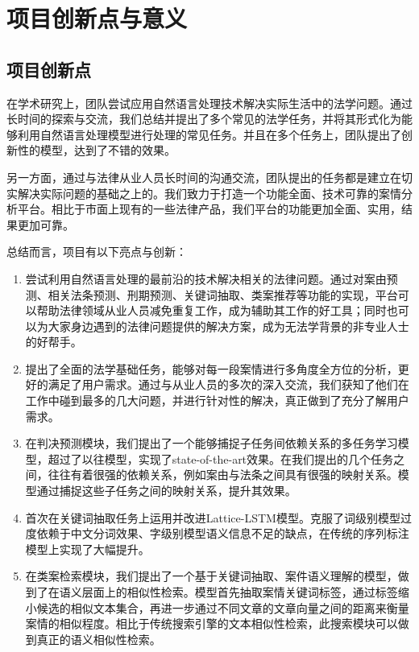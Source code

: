 \chapter{项目创新点与意义}
\label{cha: significance}

\section{项目创新点}

在学术研究上，团队尝试应用自然语言处理技术解决实际生活中的法学问题。通过长时间的探索与交流，我们总结并提出了多个常见的法学任务，并将其形式化为能够利用自然语言处理模型进行处理的常见任务。并且在多个任务上，团队提出了创新性的模型，达到了不错的效果。

另一方面，通过与法律从业人员长时间的沟通交流，团队提出的任务都是建立在切实解决实际问题的基础之上的。我们致力于打造一个功能全面、技术可靠的案情分析平台。相比于市面上现有的一些法律产品，我们平台的功能更加全面、实用，结果更加可靠。

总结而言，项目有以下亮点与创新：

\begin{enumerate}[1)]
	\item 尝试利用自然语言处理的最前沿的技术解决相关的法律问题。通过对案由预测、相关法条预测、刑期预测、关键词抽取、类案推荐等功能的实现，平台可以帮助法律领域从业人员减免重复工作，成为辅助其工作的好工具；同时也可以为大家身边遇到的法律问题提供的解决方案，成为无法学背景的非专业人士的好帮手。
	\item 提出了全面的法学基础任务，能够对每一段案情进行多角度全方位的分析，更好的满足了用户需求。通过与从业人员的多次的深入交流，我们获知了他们在工作中碰到最多的几大问题，并进行针对性的解决，真正做到了充分了解用户需求。
	\item 在判决预测模块，我们提出了一个能够捕捉子任务间依赖关系的多任务学习模型，超过了以往模型，实现了state-of-the-art效果。在我们提出的几个任务之间，往往有着很强的依赖关系，例如案由与法条之间具有很强的映射关系。模型通过捕捉这些子任务之间的映射关系，提升其效果。
	\item 首次在关键词抽取任务上运用并改进Lattice-LSTM模型。克服了词级别模型过度依赖于中文分词效果、字级别模型语义信息不足的缺点，在传统的序列标注模型上实现了大幅提升。
	\item 在类案检索模块，我们提出了一个基于关键词抽取、案件语义理解的模型，做到了在语义层面上的相似性检索。模型首先抽取案情关键词标签，通过标签缩小候选的相似文本集合，再进一步通过不同文章的文章向量之间的距离来衡量案情的相似程度。相比于传统搜索引擎的文本相似性检索，此搜索模块可以做到真正的语义相似性检索。
\end{enumerate}


